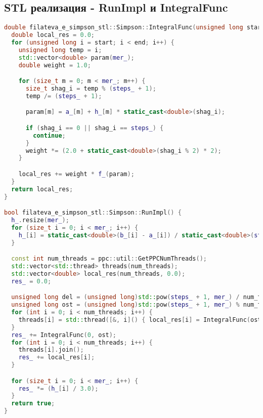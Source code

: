 \documentclass[12pt]{article}
\begin{document}
\subsection{STL реализация - RunImpl и IntegralFunc}
\begin{lstlisting}[language=C++]
double filateva_e_simpson_stl::Simpson::IntegralFunc(unsigned long start, unsigned long end) {
  double local_res = 0.0;
  for (unsigned long i = start; i < end; i++) {
    unsigned long temp = i;
    std::vector<double> param(mer_);
    double weight = 1.0;

    for (size_t m = 0; m < mer_; m++) {
      size_t shag_i = temp % (steps_ + 1);
      temp /= (steps_ + 1);

      param[m] = a_[m] + h_[m] * static_cast<double>(shag_i);

      if (shag_i == 0 || shag_i == steps_) {
        continue;
      }
      weight *= (2.0 + static_cast<double>(shag_i % 2) * 2);
    }

    local_res += weight * f_(param);
  }
  return local_res;
}

bool filateva_e_simpson_stl::Simpson::RunImpl() {
  h_.resize(mer_);
  for (size_t i = 0; i < mer_; i++) {
    h_[i] = static_cast<double>(b_[i] - a_[i]) / static_cast<double>(steps_);
  }

  const int num_threads = ppc::util::GetPPCNumThreads();
  std::vector<std::thread> threads(num_threads);
  std::vector<double> local_res(num_threads, 0.0);
  res_ = 0.0;

  unsigned long del = (unsigned long)std::pow(steps_ + 1, mer_) / num_threads;
  unsigned long ost = (unsigned long)std::pow(steps_ + 1, mer_) % num_threads;
  for (int i = 0; i < num_threads; i++) {
    threads[i] = std::thread([&, i]() { local_res[i] = IntegralFunc(ost + (del * i), ost + (del * (i + 1))); });
  }
  res_ += IntegralFunc(0, ost);
  for (int i = 0; i < num_threads; i++) {
    threads[i].join();
    res_ += local_res[i];
  }

  for (size_t i = 0; i < mer_; i++) {
    res_ *= (h_[i] / 3.0);
  }
  return true;
}
\end{lstlisting}
\newpage
\end{document}
